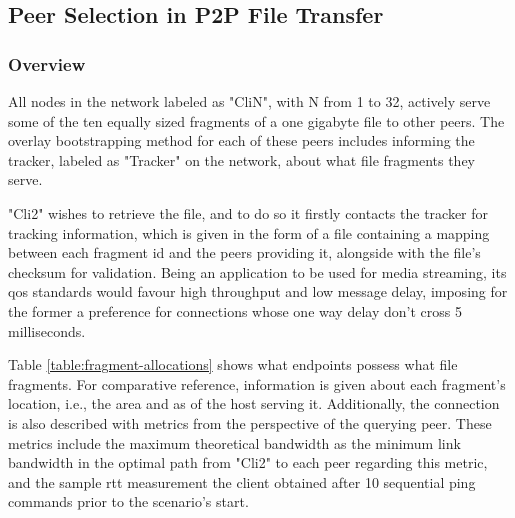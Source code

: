 \subsection{Peer Selection in P2P File Transfer}

\label{ssec:scenario1}

\subsubsection{Overview}

    All nodes in the network labeled as "CliN", with N from 1 to 32, actively serve some of the ten equally sized fragments of a one gigabyte file to other peers.
    The overlay bootstrapping method for each of these peers includes informing the tracker, labeled as "Tracker" on the network, about what file fragments they serve.

    "Cli2" wishes to retrieve the file, and to do so it firstly contacts the tracker for tracking information, which is given in the form of a file containing a mapping between each fragment \gls{id} and the peers providing it, alongside with the file's checksum for validation.
    Being an application to be used for media streaming, its \gls{qos} standards would favour high throughput and low message delay, imposing for the former a preference for connections whose one way delay don't cross 5 milliseconds.

    Table \ref{table:fragment-allocations} shows what endpoints possess what file fragments.
    For comparative reference, information is given about each fragment's location, i.e., the area and \gls{as} of the host serving it.
    Additionally, the connection is also described with metrics from the perspective of the querying peer.
    These metrics include the maximum theoretical bandwidth as the minimum link bandwidth in the optimal path from "Cli2" to each peer regarding this metric, and the sample \gls{rtt} measurement the client obtained after 10 sequential ping commands prior to the scenario's start.

